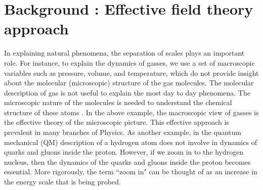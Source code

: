 \chapter{Background : Effective field theory approach}
In explaining natural phenomena, the separation of scales plays an important role. For instance, to explain the dynamics of gasses, we use a set of macroscopic variables such as pressure, volume, and temperature, which do not provide insight about the molecular (microscopic) structure of the gas molecules. The molecular description of gas is not useful to explain the most day to day phenomena. The microscopic nature of the molecules is needed to understand the chemical structure of these atoms \cite{Petrov:2016azi}. In the above example, the macroscopic view of gasses is the effective theory of the microscopic picture. This effective approach is prevalent in many branches of Physics. As another example, in the quantum mechanical (QM) description of a hydrogen atom does not involve in dynamics of quarks and gluons inside the proton. However, if we zoom in to the hydrogen nucleus, then the dynamics of the quarks and gluons inside the proton becomes essential. More rigorously, the term ``zoom in" can be thought of as an increase in the energy scale that is being probed.\par

